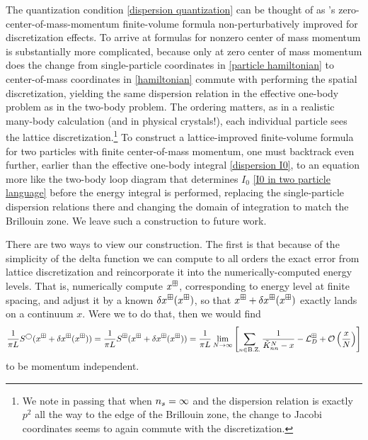 The quantization condition \eqref{dispersion quantization} can be thought of as \Luscher's zero-center-of-mass-momentum finite-volume formula non-perturbatively improved for discretization effects.
To arrive at formulas for nonzero center of mass momentum is substantially more complicated, because only at zero center of mass momentum does the change from single-particle coordinates in \eqref{particle hamiltonian} to center-of-mass coordinates in \eqref{hamiltonian} commute with performing the spatial discretization, yielding the same dispersion relation in the effective one-body problem as in the two-body problem.
The ordering matters, as in a realistic many-body calculation (and in physical crystals!), each individual particle sees the lattice discretization.\footnote{
We note in passing that when ${n_s}=\infty$ and the dispersion relation is exactly $p^2$ all the way to the edge of the Brillouin zone, the change to Jacobi coordinates seems to again commute with the discretization.}
To construct a lattice-improved finite-volume formula for two particles with finite center-of-mass momentum, one must backtrack even further, earlier than the effective one-body integral \eqref{dispersion I0}, to an equation more like the two-body loop diagram that determines $I_0$ \eqref{I0 in two particle language} before the energy integral is performed, replacing the single-particle dispersion relations there and changing the domain of integration to match the Brillouin zone.
We leave such a construction to future work.

There are two ways to view our construction.
The first is that because of the simplicity of the delta function we can compute to all orders the exact error from lattice discretization and reincorporate it into the numerically-computed energy levels.
That is, numerically compute $x^\boxplus$, corresponding to energy level at finite spacing, and adjust it by a known $\delta x^\boxplus(x^\boxplus)$, so that $x^\boxplus+\delta x^\boxplus(x^\boxplus)$ exactly lands on a continuum $x$.
Were we to do that, then we would find
\begin{equation}
    \frac{1}{\pi L}S^\bigcirc(x^\boxplus+\delta x^\boxplus(x^\boxplus))
    =
    \frac{1}{\pi L}S^{\boxplus}(x^\boxplus+\delta x^\boxplus(x^\boxplus))
    =
    \frac{1}{\pi L} \lim_{N\rightarrow\infty}\left[
        \sum_{n\in\text{B.Z.}}\frac{1}{\tilde{K}^N_{nn}-x} - \mathcal{L}^\boxplus_D + \mathcal{O}\left(\frac{x}{N}\right)
    \right]
\end{equation}
to be momentum independent.

